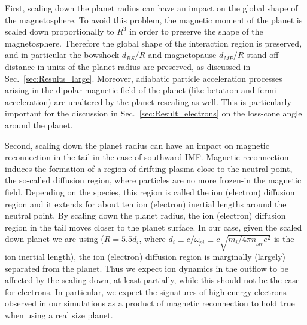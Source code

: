 \documentclass{aa}
\begin{document}
First, scaling down the planet radius can have an impact on the global shape of the magnetosphere. To avoid this problem, the magnetic moment of the planet is scaled down proportionally to $R^3$ in order to preserve the shape of the magnetosphere. Therefore the global shape of the interaction region is preserved, and in particular the bowshock $d_{BS}/R$ and magnetopause $d_{MP}/R$ stand-off distance in units of the planet radius are preserved, as discussed in Sec.~\ref{sec:Results_large}.
Moreover, adiabatic particle acceleration processes arising in the dipolar magnetic field of the planet (like betatron and fermi acceleration) are unaltered by the planet rescaling as well. This is particularly important for the discussion in Sec.~\ref{sec:Result_electrons} on the loss-cone angle around the planet.

Second, scaling down the planet radius can have an impact on magnetic reconnection in the tail in the case of southward IMF. Magnetic reconnection induces the formation of a region of drifting plasma close to the neutral point, the so-called diffusion region, where particles are no more frozen-in the magnetic field. Depending on the species, this region is called the ion (electron) diffusion region and it extends for about ten ion (electron) inertial lengths around the neutral point.
By scaling down the planet radius, the ion (electron) diffusion region in the tail moves closer to the planet surface. 
In our case, given the scaled down planet we are using ($R=5.5 d_i$, where $d_i\equiv c/\omega_{pi} \equiv c\sqrt{m_i/4\pi n_{_{SW}}e^2}$ is the ion inertial length), the ion (electron) diffusion region is marginally (largely) separated from the planet. Thus we expect ion dynamics in the outflow to be affected by the scaling down, at least partially, while this should not be the case for electrons. In particular, we expect the signatures of high-energy electrons observed in our simulations as a product of magnetic reconnection to hold true when using a real size planet.
\end{document}
